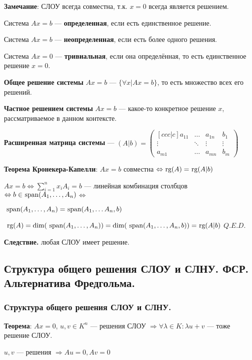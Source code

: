 \textbf{Замечание}: СЛОУ всегда совместна, т.к. \(x = 0\) всегда является решением.

Система \(Ax = b\) --- \textbf{определенная}, если есть единственное решение.

Система \(Ax = b\) --- \textbf{неопределенная}, если есть более одного решения.

Система \(Ax = 0\) --- \textbf{тривиальная}, если она определённая, то есть единственное решение \(x = 0\).

\textbf{Общее решение системы} \(Ax = b\) --- \(\{\forall x | Ax = b\}\), то есть множество всех его решений.

\textbf{Частное решением системы} \(Ax = b\) --- какое-то конкретное решение \(x\), рассматриваемое в данном контексте.

\textbf{Расширенная матрица системы} --- \((A | b) =
\begin{pmatrix}[ccc|c]
    a_{11} & \ldots & a_{1n} & b_1    \\
    \vdots & \ddots & \vdots & \vdots \\
    a_{m1} & \ldots & a_{mn} & b_m
\end{pmatrix}\)

\textbf{Теорема Кронекера-Капелли}: \(Ax = b\) совместна \(\Leftrightarrow \rg(A) = \rg(A|b)\)

$Ax = b \Leftrightarrow \sum\limits_{i=1}^n x_i A_i = b$ --- линейная комбинация столбцов $\Leftrightarrow b \in \spann(A_1, \ldots, A_n) $$\Leftrightarrow$

$\spann(A_1, \ldots, A_n) = \spann(A_1,\ldots A_n, b)$

\(\rg(A) = \dim(\spann(A_1,\ldots, A_n)) = \dim(\spann(A_1, \ldots, A_n, b)) = \rg(A | b)\) \(Q.E.D.\)

\textbf{Следствие.} любая СЛОУ имеет решение.


\subsection{Структура общего решения СЛОУ и СЛНУ. ФСР. Альтернатива Фредгольма.}

\subsubsection{Структура общего решения СЛОУ и СЛНУ.}
\textbf{Теорема}: \(Ax = 0\), \(u,v \in K^n\) --- решения СЛОУ \(\Rightarrow \forall \lambda \in K: \lambda u + v\) --- тоже решение СЛОУ.

\(u, v\) --- решения \(\Rightarrow Au = 0, Av = 0\)

